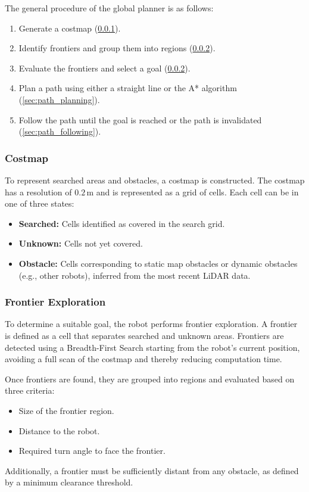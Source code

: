 The general procedure of the global planner is as follows:
\begin{enumerate}
  \item Generate a costmap (\cref{sec:costmap}).
  \item Identify frontiers and group them into regions (\cref{sec:frontier_exploration}).
  \item Evaluate the frontiers and select a goal (\cref{sec:frontier_exploration}).
  \item Plan a path using either a straight line or the A* algorithm (\cref{sec:path_planning}).
  \item Follow the path until the goal is reached or the path is invalidated (\cref{sec:path_following}).
\end{enumerate}

\subsubsection{Costmap}\label{sec:costmap}
To represent searched areas and obstacles, a costmap is constructed. 
The costmap has a resolution of $0.2\,\text{m}$ and is represented as a grid of cells. Each cell can be in one of three states:
\begin{itemize}
  \item \textbf{Searched:} Cells identified as covered in the search grid.
  \item \textbf{Unknown:} Cells not yet covered.
  \item \textbf{Obstacle:} Cells corresponding to static map obstacles or dynamic obstacles (e.g., other robots), inferred from the most recent LiDAR data.
\end{itemize}

\subsubsection{Frontier Exploration}\label{sec:frontier_exploration}
To determine a suitable goal, the robot performs frontier exploration.
A frontier is defined as a cell that separates searched and unknown areas.
Frontiers are detected using a Breadth-First Search starting from the robot’s current position, avoiding a full scan of the costmap and thereby reducing computation time.

Once frontiers are found, they are grouped into regions and evaluated based on three criteria:
\begin{itemize}
  \item Size of the frontier region.
  \item Distance to the robot.
  \item Required turn angle to face the frontier.
\end{itemize}
Additionally, a frontier must be sufficiently distant from any obstacle, as defined by a minimum clearance threshold.

